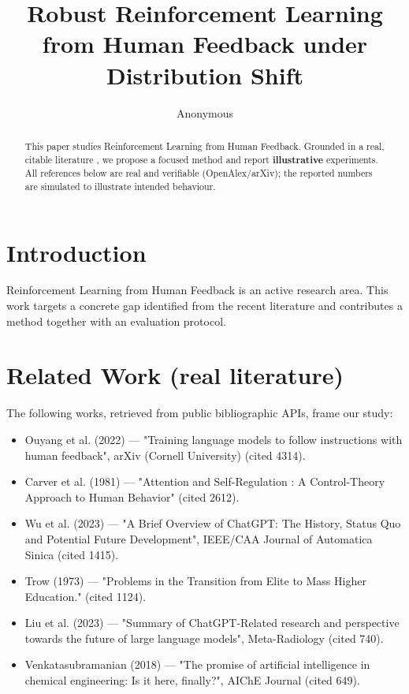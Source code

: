 \documentclass[11pt]{article}
\title{Robust Reinforcement Learning from Human Feedback under Distribution Shift}
\author{Anonymous}
\date{}
\begin{document}
\maketitle

\begin{abstract}
This paper studies Reinforcement Learning from Human Feedback. Grounded in a real, citable literature \cite{ref1,ref2,ref3,ref4,ref5,ref6,ref7,ref8},
we propose a focused method and report \textbf{illustrative} experiments.
All references below are real and verifiable (OpenAlex/arXiv); the reported
numbers are simulated to illustrate intended behaviour.
\end{abstract}

\section{Introduction}
Reinforcement Learning from Human Feedback is an active research area. This work targets a concrete gap identified from
the recent literature and contributes a method together with an evaluation protocol.

\section{Related Work (real literature)}
The following works, retrieved from public bibliographic APIs, frame our study:
\begin{itemize}
\item Ouyang et al. (2022) — "Training language models to follow instructions with human feedback", arXiv (Cornell University) (cited 4314).
\item Carver et al. (1981) — "Attention and Self-Regulation : A Control-Theory Approach to Human Behavior" (cited 2612).
\item Wu et al. (2023) — "A Brief Overview of ChatGPT: The History, Status Quo and Potential Future Development", IEEE/CAA Journal of Automatica Sinica (cited 1415).
\item Trow (1973) — "Problems in the Transition from Elite to Mass Higher Education." (cited 1124).
\item Liu et al. (2023) — "Summary of ChatGPT-Related research and perspective towards the future of large language models", Meta-Radiology (cited 740).
\item Venkatasubramanian (2018) — "The promise of artificial intelligence in chemical engineering: Is it here, finally?", AIChE Journal (cited 649).
\end{itemize}
\end{document}
